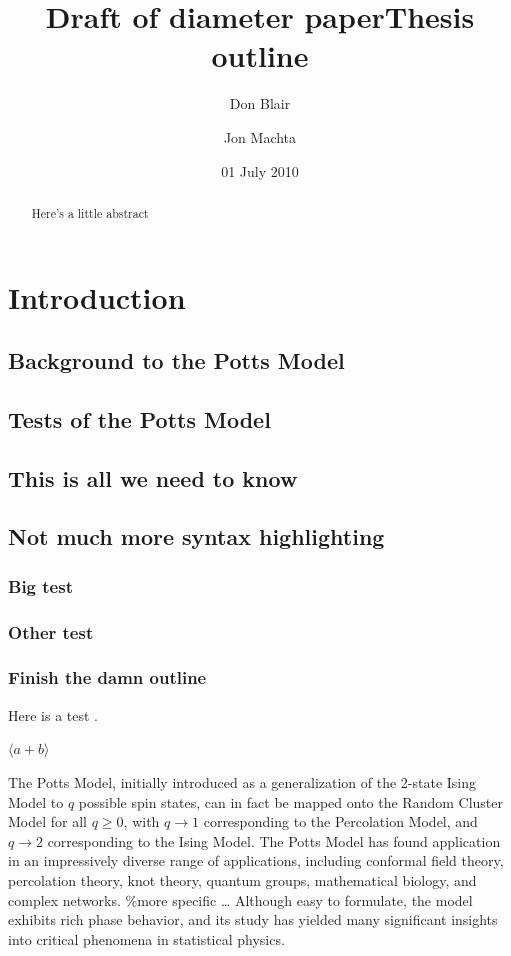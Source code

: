 \documentclass[aps, twocolumn, groupedaddress]{revtex4}
\title{Draft of diameter paper}
\date{01 July 2010}
\newcommand{\lb}{{\langle}}
\newcommand{\rb}{{\rangle}}
\begin{document}
\title{Thesis outline}
\author{Don Blair}
\author{Jon Machta}
\begin {abstract}
Here's a little abstract
\end{abstract}
\maketitle{}
\section{Introduction}
\label{sec-1}
\subsection{Background to the Potts Model}
\label{sec-1.1}
\subsection{Tests of the Potts Model}
\label{sec-1.2}
\subsection{This is all we need to know}
\label{sec-1.3}
\subsection{Not much more syntax highlighting}
\label{sec-1.4}
\subsubsection{Big test}
\label{sec-1.4.1}
\subsubsection{Other test}
\label{sec-1.4.2}
\subsubsection{Finish the damn outline}
\label{sec-1.4.3}

Here is a test \cite{OsSo04}.  

$\lb a + b \rb$    
    
The Potts Model, initially introduced as a generalization of the 2-state Ising Model to $q$ possible spin states, can in fact be mapped onto the Random Cluster Model for all $q \ge 0$, with $q \to 1$ corresponding to the Percolation Model, and $q \to 2$ corresponding to the Ising Model.  The Potts Model has found application in an impressively diverse range of applications, including conformal field theory, percolation theory, knot theory, quantum groups, mathematical biology, and complex networks.    
\%more specific \ldots{}    
Although easy to formulate, the model exhibits rich phase behavior, and its study has yielded many significant insights into critical phenomena in statistical physics. 
\end{document}
